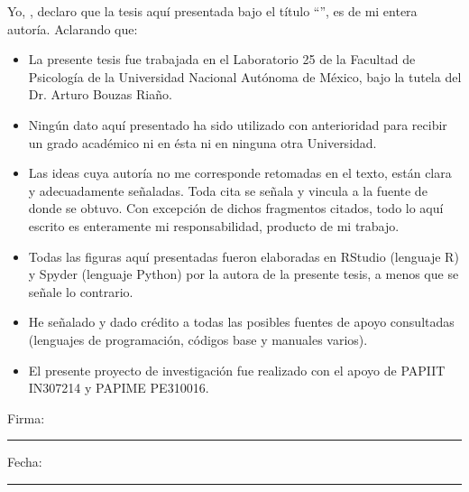 \documentclass[
12pt, %
spanish, %
singlespacing, %
headsepline, %
]{MastersDoctoralThesis} %
\begin{document}
\begin{declaration}
\addchaptertocentry{\authorshipname} %
\noindent Yo, \authorname, declaro que la tesis aquí presentada bajo el título \enquote{\ttitle}, es de mi entera autoría. Aclarando que:\\

\begin{itemize} 
\item La presente tesis fue trabajada en el Laboratorio 25 de la Facultad de Psicología de la Universidad Nacional Autónoma de México, bajo la tutela del Dr. Arturo Bouzas Riaño. 
\item Ningún dato aquí presentado ha sido utilizado con anterioridad para recibir un grado académico ni en ésta ni en ninguna otra Universidad. 
\item Las ideas cuya autoría no me corresponde retomadas en el texto, están clara y adecuadamente señaladas. Toda cita se señala y vincula a la fuente de donde se obtuvo. Con excepción de dichos fragmentos citados, todo lo aquí escrito es enteramente mi responsabilidad, producto de mi trabajo. 
\item Todas las figuras aquí presentadas fueron elaboradas en RStudio (lenguaje R) y Spyder (lenguaje Python) por la autora de la presente tesis, a menos que se señale lo contrario.
\item He señalado y dado crédito a todas las posibles fuentes de apoyo consultadas (lenguajes de programación, códigos base y manuales varios).
\item El presente proyecto de investigación fue realizado con el apoyo de PAPIIT IN307214 y PAPIME PE310016.\\
\end{itemize}
 
\noindent Firma:\\
\rule[0.5em]{25em}{0.5pt} %
 
\noindent Fecha:\\
\rule[0.5em]{25em}{0.5pt} %
\end{declaration}

\cleardoublepage

\end{document}
